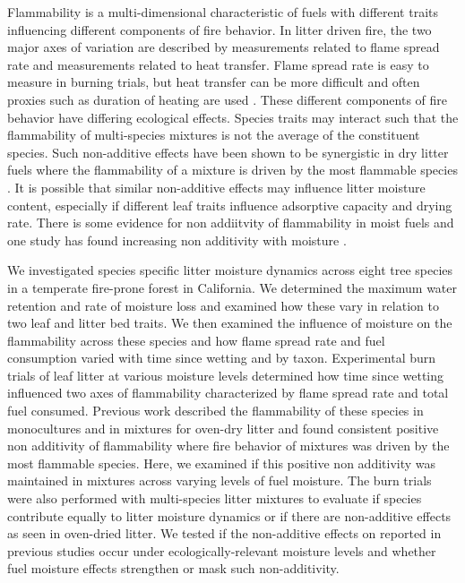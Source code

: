 \documentclass[fire,article,submit,moreauthors,pdftex]{Definitions/mdpi}
\begin{document}
Flammability is a multi-dimensional characteristic of fuels \citep{Schwilk-2015, Pausas+Keeley+etal-2017} with different traits influencing different components of fire behavior. In litter driven fire, the two major axes of variation are described by measurements related to flame spread rate and measurements related to heat transfer. Flame spread rate is easy to measure in burning trials, but heat transfer can be more difficult and often proxies such as duration of heating are used \citep{Magalhaes+Schwilk-2012, Varner+Kane+etal-2015}. These different components of fire behavior have differing ecological effects. Species traits may interact such that the flammability of multi-species mixtures is not the average of the constituent species. Such non-additive effects have been shown to be synergistic in dry litter fuels where the flammability of a mixture is driven by the most flammable species  \cite{VanAltena+Logtestjin+etal-2012, Magalhaes+Schwilk-2012}. It is possible that similar non-additive effects may influence litter moisture content, especially if different leaf traits influence adsorptive capacity and drying rate. There is some evidence for non addiitvity of flammability in moist fuels and one study has found increasing non additivity with moisture \cite{Blauw+Wensink+etal-2015}.

We investigated species specific litter moisture dynamics across eight tree species in a temperate fire-prone forest in California. We determined the maximum water retention and rate of moisture loss and examined how these vary in relation to two leaf and litter bed traits.  We then examined the influence of moisture on the flammability across these species and how flame spread rate and fuel consumption varied with time since wetting and by taxon. Experimental burn trials of leaf litter at various moisture levels determined how time since wetting influenced two axes of flammability characterized by flame spread rate and total fuel consumed. Previous work described the flammability of these species in monocultures and in mixtures for oven-dry litter \cite{Magalhaes+Schwilk-2012} and found consistent positive non additivity of flammability where fire behavior of mixtures was driven by the most flammable species. Here, we examined if this positive non additivity was maintained in mixtures across varying levels of fuel moisture. The burn trials were also performed with multi-species litter mixtures to evaluate if species contribute equally to litter moisture dynamics or if there are non-additive effects as seen in oven-dried litter. We tested if the non-additive effects on  reported in previous studies occur under ecologically-relevant moisture levels and whether fuel moisture effects strengthen or mask such non-additivity.
\end{document}
